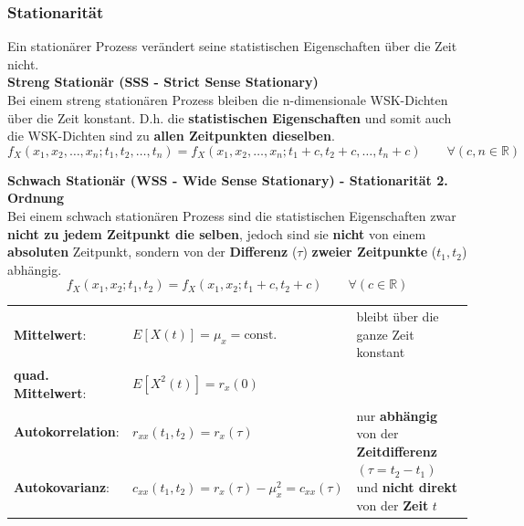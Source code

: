 \subsubsection{Stationarität}
Ein stationärer Prozess verändert seine statistischen Eigenschaften über die Zeit nicht. \\

\textbf{Streng Stationär (SSS - Strict Sense Stationary)}\\
Bei einem streng stationären Prozess bleiben die n-dimensionale WSK-Dichten über die
Zeit konstant. D.h. die \textbf{statistischen Eigenschaften} und somit auch die WSK-Dichten sind zu 
\textbf{allen Zeitpunkten dieselben}.
$$ f_X(x_1, x_2, \ldots, x_n; t_1, t_2, \ldots, t_n) =
		f_X(x_1, x_2, \ldots, x_n; t_1+c, t_2+c, \ldots, t_n+c) \qquad \forall (c,n \in
		\mathbb{R})$$

\textbf{Schwach Stationär (WSS - Wide Sense Stationary) - Stationarität 2. Ordnung}\\
Bei einem schwach stationären Prozess sind die statistischen Eigenschaften zwar
\textbf{nicht zu jedem Zeitpunkt die selben}, jedoch sind sie \textbf{nicht} von einem \textbf{absoluten} Zeitpunkt, sondern
von der \textbf{Differenz} ($\tau$) \textbf{zweier Zeitpunkte} ($t_1, t_2$) abhängig.  \\ 
$$ f_X(x_1, x_2; t_1, t_2) = f_X(x_1, x_2; t_1+c, t_2+c) \qquad \forall (c \in
		\mathbb{R})$$
\renewcommand{\arraystretch}{1.4}
\begin{tabular}[c]{ p{3.3cm}  p{6.5cm} p{8cm} }
	\textbf{Mittelwert}: 	&  $E[X(t)] = \mu_{x} = \text{const.}$  
							& bleibt über die ganze Zeit konstant\\ 
	\textbf{quad. Mittelwert}: 	&  $E[X^{2}(t)] = r_{x}(0)$  \\ 
	\textbf{Autokorrelation}: 	& 	$r_{xx}(t_{1},t_{2}) = r_{x}(\tau)$
	& \multirow{2}{8cm}{nur \textbf{abhängig} von der \textbf{Zeitdifferenz} $(\tau = t_2 - t_1)$ und \textbf{nicht direkt} von
	 der \textbf{Zeit} $t$} \\
	 \textbf{Autokovarianz}:		& $ c_{xx}(t_{1},t_{2}) = r_{x}(\tau) - \mu_{x}^{2} = c_{xx}(\tau)$ \\
\end{tabular}
\renewcommand{\arraystretch}{1}
 
